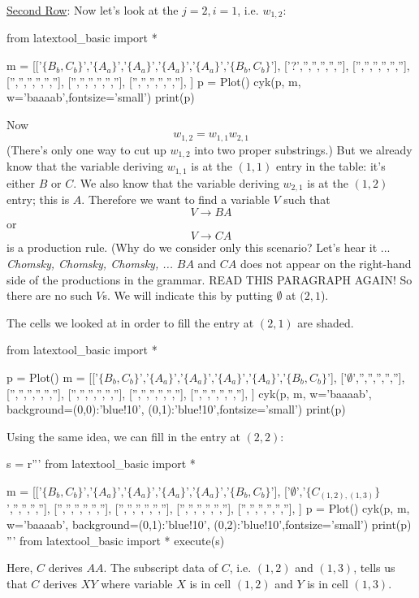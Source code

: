 \underline{Second Row}:
Now let's look at the $j=2, i=1$, i.e. $w_{1, 2}$:
\begin{python}
from latextool_basic import *

m = [['$\{B_b,C_b\}$','$\{A_a\}$','$\{A_a\}$','$\{A_a\}$','$\{A_a\}$','$\{B_b,C_b\}$'],
     ['?','','','','',''],
     ['','','','','',''],
     ['','','','','',''],
     ['','','','','',''],
     ['','','','','',''],
     ]
p = Plot()
cyk(p, m, w='baaaab',fontsize='small')
print(p)
\end{python}
Now
\[
w_{1,2} = w_{1,1} w_{2,1}
\]
(There's only one way to cut up $w_{1,2}$ into two proper substrings.)
But we already know that the variable deriving $w_{1,1}$ is at the $(1,1)$
entry in the table: it's either $B$ or $C$.
We also know that the variable deriving $w_{2,1}$ is at the $(1,2)$ entry;
this is $A$.
Therefore we want to find a variable $V$ such that 
\[
V \rightarrow BA
\]
or
\[
V \rightarrow CA
\]
is a production rule.
(Why do we consider only this scenario? Let's hear it ... 
\textit{ Chomsky, Chomsky, Chomsky, ...}
$BA$ and $CA$ does not appear on the right-hand side of the productions in 
the grammar.
READ THIS PARAGRAPH AGAIN!
So there are no such $V$s.
We will indicate this by putting $\emptyset$ at $(2, 1$).

The cells we looked at in order to fill the entry at $(2,1)$ are shaded.
\begin{python}
from latextool_basic import *

p = Plot()
m = [['$\{B_b,C_b\}$','$\{A_a\}$','$\{A_a\}$','$\{A_a\}$','$\{A_a\}$','$\{B_b,C_b\}$'],
     ['$\emptyset$','','','','',''],
     ['','','','','',''],
     ['','','','','',''],
     ['','','','','',''],
     ['','','','','',''],
     ]
cyk(p, m, w='baaaab', background={(0,0):'blue!10', (0,1):'blue!10'},fontsize='small')
print(p)
\end{python}

Using the same idea, we can fill in the entry at $(2,2)$:
\begin{python}
s = r'''
from latextool_basic import *

m = [['$\{B_b,C_b\}$','$\{A_a\}$','$\{A_a\}$','$\{A_a\}$','$\{A_a\}$','$\{B_b,C_b\}$'],
     ['$\emptyset$','$\{C_{(1,2),(1,3)}\}$','','','',''],
     ['','','','','',''],
     ['','','','','',''],
     ['','','','','',''],
     ['','','','','',''],
     ]
p = Plot()
cyk(p, m, w='baaaab', background={(0,1):'blue!10', (0,2):'blue!10'},fontsize='small')
print(p)
'''
from latextool_basic import *
execute(s)
\end{python}
Here, $C$ derives $AA$.
The subscript data of $C$, i.e. $(1,2)$ and $(1,3)$, tells us that $C$
derives $XY$ where variable $X$ is in cell $(1,2)$ and
$Y$ is in cell $(1, 3)$.

